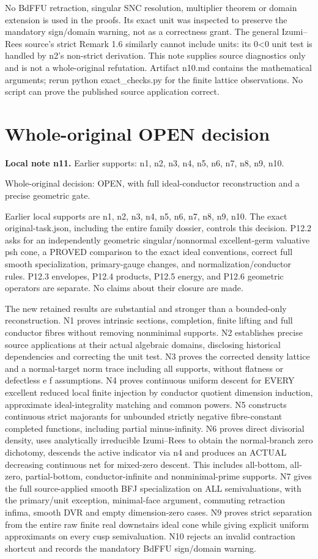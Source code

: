 \documentclass[11pt]{article}
\begin{document}
No BdFFU retraction, singular SNC resolution, multiplier theorem or domain extension is used in the proofs. Its exact unit was inspected to preserve the mandatory sign/domain warning, not as a correctness grant. The general Izumi--Rees source's strict Remark 1.6 similarly cannot include units: its 0<0 unit test is handled by n2's non-strict derivation. This note supplies source diagnostics only and is not a whole-original refutation. Artifact n10.md contains the mathematical arguments; rerun python exact\_checks.py for the finite lattice observations. No script can prove the published source application correct.


\section{Whole-original OPEN decision}
\label{sec:n11}
\noindent\textbf{Local note n11.} Earlier supports: n1, n2, n3, n4, n5, n6, n7, n8, n9, n10.

Whole-original decision: OPEN, with full ideal-conductor reconstruction and a precise geometric gate.

Earlier local supports are n1, n2, n3, n4, n5, n6, n7, n8, n9, n10. The exact original-task.json, including the entire family dossier, controls this decision. P12.2 asks for an independently geometric singular/nonnormal excellent-germ valuative psh cone, a PROVED comparison to the exact ideal conventions, correct full smooth specialization, primary-gauge changes, and normalization/conductor rules. P12.3 envelopes, P12.4 products, P12.5 energy, and P12.6 geometric operators are separate. No claims about their closure are made.

The new retained results are substantial and stronger than a bounded-only reconstruction. N1 proves intrinsic sections, completion, finite lifting and full conductor fibres without removing nonminimal supports. N2 establishes precise source applications at their actual algebraic domains, disclosing historical dependencies and correcting the unit test. N3 proves the corrected density lattice and a normal-target norm trace including all supports, without flatness or defectless e f assumptions. N4 proves continuous uniform descent for EVERY excellent reduced local finite injection by conductor quotient dimension induction, approximate ideal-integrality matching and common powers. N5 constructs continuous strict majorants for unbounded strictly negative fibre-constant completed functions, including partial minus-infinity. N6 proves direct divisorial density, uses analytically irreducible Izumi--Rees to obtain the normal-branch zero dichotomy, descends the active indicator via n4 and produces an ACTUAL decreasing continuous net for mixed-zero descent. This includes all-bottom, all-zero, partial-bottom, conductor-infinite and nonminimal-prime supports. N7 gives the full source-applied smooth BFJ specialization on ALL semivaluations, with the primary/unit exception, minimal-face argument, commuting retraction infima, smooth DVR and empty dimension-zero cases. N9 proves strict separation from the entire raw finite real downstairs ideal cone while giving explicit uniform approximants on every cusp semivaluation. N10 rejects an invalid contraction shortcut and records the mandatory BdFFU sign/domain warning.
\end{document}
